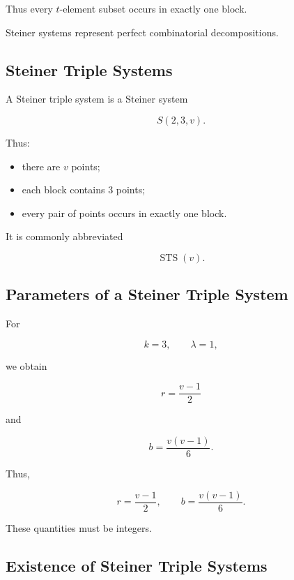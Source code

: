 Thus every \(t\)-element subset occurs in exactly one block.

Steiner systems represent perfect combinatorial decompositions.

\subsection{Steiner Triple Systems}
\label{subsec:steiner-triple-systems}

A Steiner triple system is a Steiner system

\[
\boxed{
S(2,3,v).
}
\]

Thus:

\begin{itemize}
    \item there are \(v\) points;
    \item each block contains \(3\) points;
    \item every pair of points occurs in exactly one block.
\end{itemize}

It is commonly abbreviated

\[
\boxed{
\operatorname{STS}(v).
}
\]

\subsection{Parameters of a Steiner Triple System}
\label{subsec:sts-parameters}

For

\[
k=3,
\qquad
\lambda=1,
\]

we obtain

\[
r
=
\frac{v-1}{2}
\]

and

\[
b
=
\frac{v(v-1)}{6}.
\]

Thus,

\[
\boxed{
r=\frac{v-1}{2},
\qquad
b=\frac{v(v-1)}{6}.
}
\]

These quantities must be integers.

\subsection{Existence of Steiner Triple Systems}
\label{subsec:sts-existence}

